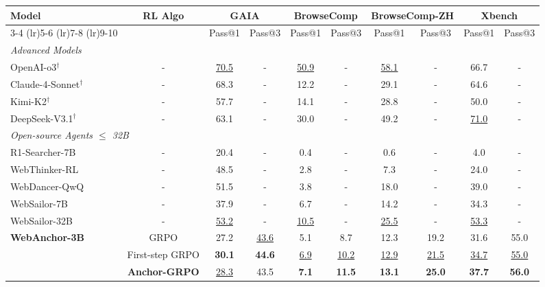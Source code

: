 
\begin{table}[t]
\centering
\small
\setlength{\tabcolsep}{4pt}
\begin{tabular}{lccccccccc}
\toprule
\multirow{3}{*}{Model} & \multirow{3}{*}{RL Algo}  & \multicolumn{2}{c}{GAIA} & \multicolumn{2}{c}{BrowseComp} & \multicolumn{2}{c}{BrowseComp-ZH} & \multicolumn{2}{c}{Xbench} \\
\cmidrule(lr){3-4} \cmidrule(lr){5-6} \cmidrule(lr){7-8} \cmidrule(lr){9-10}
& & Pass@1 & Pass@3 & Pass@1 & Pass@3 & Pass@1 & Pass@3 & Pass@1 & Pass@3 \\
\midrule
\multicolumn{9}{l}{\textit{Advanced Models}} \\
OpenAI-o3$^\dagger$ & - & \underline{70.5} & - & \underline{50.9} & - & \underline{58.1} & - & 66.7 & - \\
Claude-4-Sonnet$^\dagger$ & - & 68.3 & - & 12.2 & -& 29.1 & - & 64.6 & -  \\
Kimi-K2$^\dagger$ & - & 57.7 & - & 14.1 & - & 28.8 & - & 50.0 & - \\
DeepSeek-V3.1$^\dagger$ & - & 63.1 & - & 30.0 & -  & 49.2 & - & \underline{71.0} & -\\
\midrule
\multicolumn{9}{l}{\textit{Open-source Agents $\leq$ 32B}} \\
R1-Searcher-7B & - & 20.4 & - & 0.4 & - & 0.6 & - & 4.0 & - \\
WebThinker-RL & - & 48.5& - & 2.8 & - & 7.3 & - & 24.0 & - \\
WebDancer-QwQ & - & 51.5 & - & 3.8 & - & 18.0 & - & 39.0 & - \\
WebSailor-7B & - & 37.9 & - & 6.7 & - & 14.2 & - & 34.3 & - \\
WebSailor-32B & - & \underline{53.2} & -  & \underline{10.5} & - & \underline{25.5} & - & \underline{53.3} & - \\
\midrule
\multirow{3}{*}{\textbf{WebAnchor-3B}}
& GRPO & 27.2 & \underline{43.6} & 5.1 & 8.7 & 12.3 & 19.2 & 31.6 & 55.0 \\
& First-step GRPO & \textbf{30.1} & \textbf{44.6} & \underline{6.9} & \underline{10.2} & \underline{12.9} & \underline{21.5} & \underline{34.7} & \underline{55.0} \\
\rowcolor{lightblue} &   \textbf{Anchor-GRPO}  & \underline{28.3} & 43.5 & \textbf{7.1} & \textbf{11.5} & \textbf{13.1} & \textbf{25.0} & \textbf{37.7} & \textbf{56.0}  \\

\end{tabular}
\end{table}
